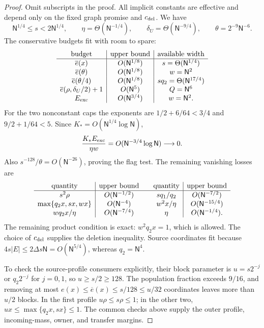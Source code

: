 \documentclass[11pt]{article} \usepackage[utf8]{inputenc}
\theoremstyle{plain} \newtheorem{theorem}{Theorem}[section]
\theoremstyle{definition} \newaliascnt{definition}{theorem}
\begin{document}
\begin{proof}
Omit subscripts in the proof. All implicit constants are effective and depend
only on the fixed graph promise and $c_{\rm del}$. We have
\[
\mathsf N^{1/4}\le s<2\mathsf N^{1/4},\qquad
\eta=\Theta(\mathsf N^{-1/4}),\qquad
\delta_U=\Theta(\mathsf N^{-9/4}),\qquad
\theta=2^{-9}\mathsf N^{-6}.
\]
The conservative budgets fit with room to spare:
\[
\begin{array}{c|c|c}
\text{budget}&\text{upper bound}&\text{available width}\\ \hline
\overline e(x)&O(\mathsf N^{1/8})&s=\Theta(\mathsf N^{1/4})\\
\overline e(\theta)&O(\mathsf N^{1/8})&w=\mathsf N^2\\
\overline e(\theta/4)&O(\mathsf N^{1/8})&sq_2=\Theta(\mathsf N^{17/4})\\
\overline e(\rho,\delta_U/2)+1&O(\mathsf N^5)&Q=\mathsf N^6\\
E_{\rm exc}&O(\mathsf N^{3/4})&w=\mathsf N^2.
\end{array}
\]
For the two nonconstant caps the exponents are
$1/2+6/64<3/4$ and $9/2+1/64<5$. Since
$K_*=O(\mathsf N^{1/4}\log\mathsf N)$,
\[
\frac{K_*E_{\rm exc}}{\eta w}
=O(\mathsf N^{-3/4}\log\mathsf N)\longrightarrow0.
\]
Also $s^{-128}/\theta=O(\mathsf N^{-26})$, proving the flag test.
The remaining vanishing losses are
\[
\begin{array}{c|c@{\qquad}c|c}
\text{quantity}&\text{upper bound}&\text{quantity}&\text{upper bound}\\ \hline
s^2\rho&O(\mathsf N^{-1/2})&
sq_1/q_2&O(\mathsf N^{-7/2})\\
\max\{q_2x,sx,wx\}&O(\mathsf N^{-4})&
w^2x/\eta&O(\mathsf N^{-15/4})\\
wq_2x/\eta&O(\mathsf N^{-7/4})&
\eta&O(\mathsf N^{-1/4}).
\end{array}
\]
The remaining product condition is exact: $w^2q_2x=1$, which is allowed.
The choice of $c_{\rm del}$ supplies the deletion inequality. Source
coordinates fit because $4s|E|\le2\Delta s\mathsf N=O(\mathsf N^{5/4})$,
whereas $q_2=\mathsf N^4$.

To check the source-profile consumers explicitly, their block parameter
is $u=s2^{-j}$ or $q_2 2^{-j}$ for $j=0,1$, so $u\ge s/2\ge128$.
The population fraction exceeds $9/16$, and removing at most
$e(x)\le\overline e(x)\le s/128\le u/32$ coordinates leaves more than
$u/2$ blocks. In the first profile $u\rho\le s\rho\le1$; in the other two,
$ux\le\max\{q_2x,sx\}\le1$. The common checks above supply the outer
profile, incoming-mass, owner, and transfer margins.


\end{proof}
\end{document}
